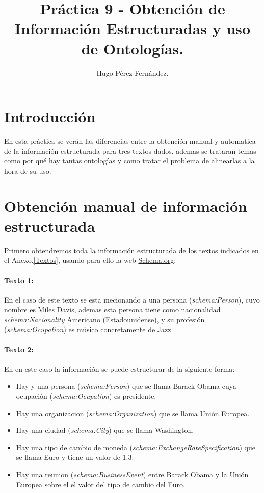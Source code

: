\documentclass[spanish]{llncs}   %
\begin{document}
\title{Práctica 9 - Obtención de Información Estructuradas y uso de Ontologías.}

\author{Hugo Pérez Fernández.  
}
\maketitle              

\section{Introducción}

En esta práctica se verán las diferencias entre la obtención manual y automatica de la información estructurada para tres textos dados, 
ademas se trataran temas como por qué hay tantas ontologías y como tratar el problema de alinearlas a la hora de su uso. 

\section{Obtención manual de información estructurada}

Primero obtendremos toda la información estructurada de los textos indicados en el Anexo.\ref{Textos}, usando para ello la web \href{https://schema.org}{Schema.org}:

\paragraph{Texto 1:}

En el caso de este texto se esta mecionando a una persona (\textit{schema:Person}), cuyo nombre es Miles Davis, ademas esta persona tiene como nacionalidad \textit{schema:Nacionality}
Americano (Estadounidense), y su profesión (\textit{schema:Ocupation}) es músico concretamente de Jazz.

\paragraph{Texto 2:}

En en este caso la información se puede estructurar de la siguiente forma:

\begin{itemize}
    \item Hay y una persona (\textit{schema:Person}) que se llama Barack Obama cuya ocupación (\textit{schema:Ocupation}) es presidente.
    \item Hay una organizacion (\textit{schema:Organization}) que se llama Unión Europea.
    \item Hay una ciudad (\textit{schema:City}) que se llama Washington.
    \item Hay una tipo de cambio de moneda (\textit{schema:ExchangeRateSpecification}) que se llama Euro y tiene un valor de 1.3.
    \item Hay una reunion (\textit{schema:BusinessEvent}) entre Barack Obama y la Unión Europea
    sobre el el valor del tipo de cambio del Euro.
\end{itemize}
\end{document}
